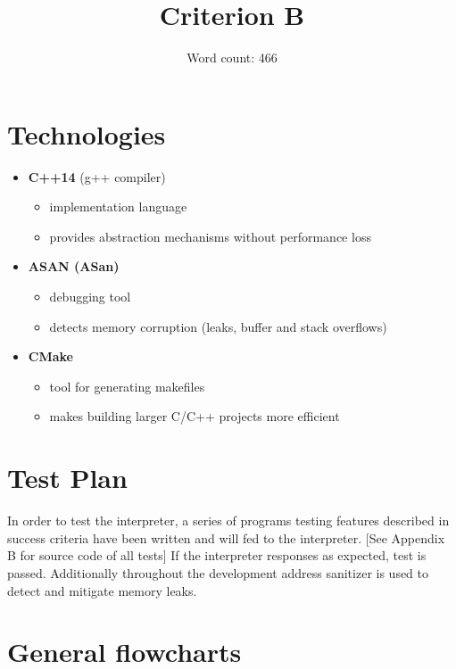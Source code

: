 \documentclass{article}
\title{Criterion B}
\author{Word count: 466}
\date{}
\begin{document}
\maketitle
\tableofcontents

\section{Technologies}

    \begin{itemize}
        \item \textbf{C++14} (g++ compiler)
            \begin{itemize}
                \item implementation language
                \item provides abstraction mechanisms without performance loss
            \end{itemize}
        \item \textbf{ASAN (ASan)} 
            \begin{itemize}
                \item debugging tool
                \item detects memory corruption (leaks, buffer and stack overflows)
            \end{itemize}
        \item \textbf{CMake}
            \begin{itemize}
                \item tool for generating makefiles 
                \item makes building larger C/C++ projects more efficient
            \end{itemize}
    \end{itemize}

\section{Test Plan}

    In order to test the interpreter, a series of programs testing features 
    described in success criteria have been written and will fed to the interpreter.
    [See Appendix B for source code of all tests] If the interpreter responses 
    as expected, test is passed. Additionally throughout the development address
    sanitizer is used to detect and mitigate memory leaks.


\section{General flowcharts}
\end{document}
